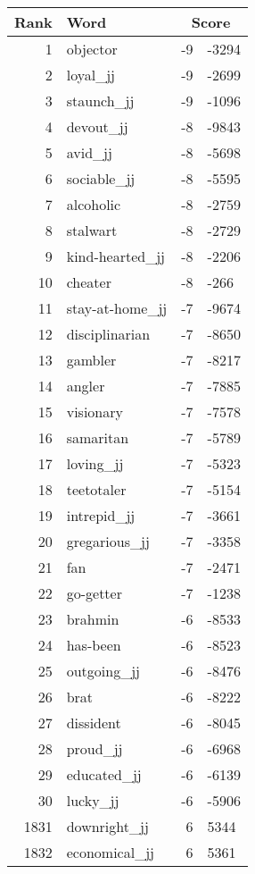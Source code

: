 \begin{longtable}[!htbp]{| rlr@{.}l |}
    \hline
    \textbf{Rank} & \textbf{Word} & \multicolumn{2}{c|}{\textbf{Score}} \\
    \hline
    \endhead
    1 & objector & -9 & -3294 \\
    2 & loyal\_jj & -9 & -2699 \\
    3 & staunch\_jj & -9 & -1096 \\
    4 & devout\_jj & -8 & -9843 \\
    5 & avid\_jj & -8 & -5698 \\
    6 & sociable\_jj & -8 & -5595 \\
    7 & alcoholic & -8 & -2759 \\
    8 & stalwart & -8 & -2729 \\
    9 & kind-hearted\_jj & -8 & -2206 \\
    10 & cheater & -8 & -266 \\
    11 & stay-at-home\_jj & -7 & -9674 \\
    12 & disciplinarian & -7 & -8650 \\
    13 & gambler & -7 & -8217 \\
    14 & angler & -7 & -7885 \\
    15 & visionary & -7 & -7578 \\
    16 & samaritan & -7 & -5789 \\
    17 & loving\_jj & -7 & -5323 \\
    18 & teetotaler & -7 & -5154 \\
    19 & intrepid\_jj & -7 & -3661 \\
    20 & gregarious\_jj & -7 & -3358 \\
    21 & fan & -7 & -2471 \\
    22 & go-getter & -7 & -1238 \\
    23 & brahmin & -6 & -8533 \\
    24 & has-been & -6 & -8523 \\
    25 & outgoing\_jj & -6 & -8476 \\
    26 & brat & -6 & -8222 \\
    27 & dissident & -6 & -8045 \\
    28 & proud\_jj & -6 & -6968 \\
    29 & educated\_jj & -6 & -6139 \\
    30 & lucky\_jj & -6 & -5906 \\
    1831 & downright\_jj & 6 & 5344 \\
    1832 & economical\_jj & 6 & 5361 \\

\end{longtable}
